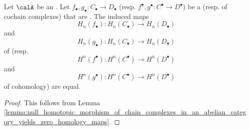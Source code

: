 \begin{lemma} \label{lemma:chain_homotopic_morphism_of_chain_complexes_in_an_abelian_category_yield_same_homology_maps}
    Let $\calA$ be an . Let $f_\bullet, g_\bullet: C_\bullet \to D_\bullet$ (resp. $f^\bullet, g^\bullet: C^\bullet \to D^\bullet$) be a  (resp. of cochain complexes) that are . 
    The induced maps 
    $$H_n(f_\bullet): H_n(C_\bullet) \to H_n(D_\bullet)$$
    and
    $$H_n(g_\bullet): H_n(C_\bullet) \to H_n(D_\bullet)$$
    of  
    (resp. 
    $$H^n(f^\bullet): H^n(C^\bullet) \to H^n(D^\bullet)$$
    and
    $$H^n(g^\bullet): H^n(C^\bullet) \to H^n(D^\bullet)$$
    of cohomology)
    are equal. 
\end{lemma}

\begin{proof}
    This follows from Lemma \ref{lemma:null_homotopic_morphism_of_chain_complexes_in_an_abelian_category_yields_zero_homology_maps}.
\end{proof}

